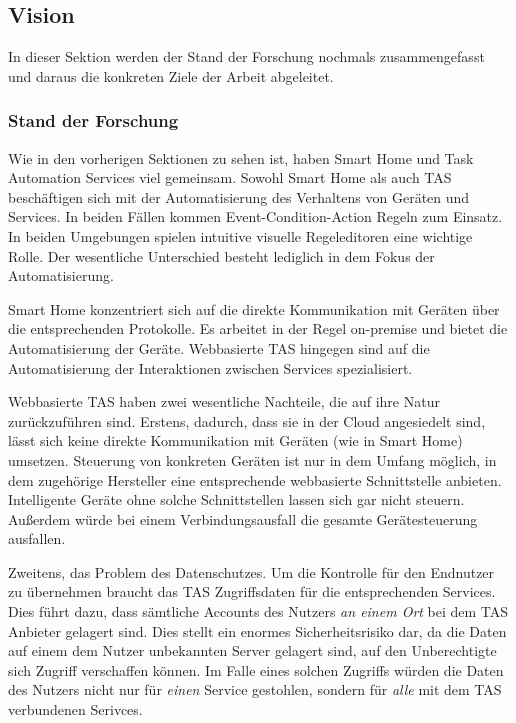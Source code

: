 \documentclass[12pt]{article}
\begin{document}
\subsection{Vision}
\label{Vision}
In dieser Sektion werden der Stand der Forschung nochmals zusammengefasst und daraus die konkreten Ziele der Arbeit abgeleitet.

\subsubsection{Stand der Forschung}
\label{sdf}
Wie in den vorherigen Sektionen zu sehen ist, haben Smart Home und Task Automation Services viel gemeinsam. Sowohl Smart Home als auch TAS beschäftigen sich mit der Automatisierung des Verhaltens von Geräten und Services. In beiden Fällen kommen Event-Condition-Action Regeln zum Einsatz. In beiden Umgebungen spielen intuitive visuelle Regeleditoren eine wichtige Rolle. Der wesentliche Unterschied besteht lediglich in dem Fokus der Automatisierung.

Smart Home konzentriert sich auf die direkte Kommunikation mit Geräten über die entsprechenden Protokolle. Es arbeitet in der Regel on-premise und bietet die Automatisierung der Geräte. Webbasierte TAS hingegen sind auf die Automatisierung der Interaktionen zwischen Services spezialisiert.

Webbasierte TAS haben zwei wesentliche Nachteile, die auf ihre Natur zurückzuführen sind. Erstens, dadurch, dass sie in der Cloud angesiedelt sind, lässt sich keine direkte Kommunikation mit Geräten (wie in Smart Home) umsetzen. Steuerung von konkreten Geräten ist nur in dem Umfang möglich, in dem zugehörige Hersteller eine entsprechende webbasierte Schnittstelle anbieten. Intelligente Geräte ohne solche Schnittstellen lassen sich gar nicht steuern. Außerdem würde bei einem Verbindungsausfall die gesamte Gerätesteuerung ausfallen.

Zweitens, das Problem des Datenschutzes\cite{cloudsec}. Um die Kontrolle für den Endnutzer zu übernehmen braucht das TAS Zugriffsdaten für die entsprechenden Services. Dies führt dazu, dass sämtliche Accounts des Nutzers \textit{an einem Ort} bei dem TAS Anbieter gelagert sind. Dies stellt ein enormes Sicherheitsrisiko dar, da   die Daten auf einem dem Nutzer unbekannten Server gelagert sind, auf den Unberechtigte sich Zugriff verschaffen können. Im Falle eines solchen Zugriffs würden die Daten des Nutzers nicht nur für \textit{einen} Service gestohlen, sondern für \textit{alle} mit dem TAS verbundenen Serivces.
\end{document}
